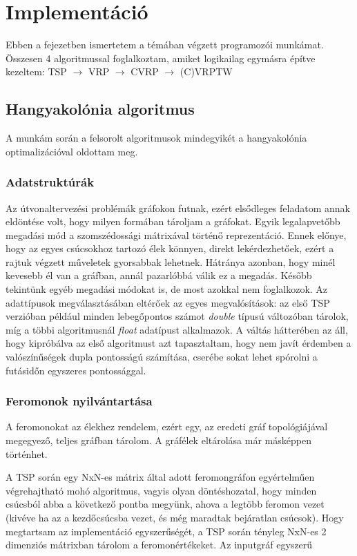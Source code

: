 \chapter{Implementáció}

Ebben a fejezetben ismertetem a témában végzett programozói munkámat. Összesen 4 algoritmussal foglalkoztam, amiket logikailag egymásra építve kezeltem:
TSP  \(\rightarrow\) VRP \(\rightarrow\) CVRP \(\rightarrow\) (C)VRPTW

\section{Hangyakolónia algoritmus}
A munkám során a felsorolt algoritmusok mindegyikét a hangyakolónia optimalizációval oldottam meg.

\subsection{Adatstruktúrák}
Az útvonaltervezési problémák gráfokon futnak, ezért elsődleges feladatom annak eldöntése volt, hogy milyen formában tároljam a gráfokat. Egyik legalapvetőbb megadási mód a szomszédossági mátrixával történő reprezentáció. Ennek előnye, hogy az egyes csúcsokhoz tartozó élek könnyen, direkt lekérdezhetőek, ezért a rajtuk végzett műveletek gyorsabbak lehetnek. Hátránya azonban, hogy minél kevesebb él van a gráfban, annál pazarlóbbá válik ez a megadás. Később tekintünk egyéb megadási módokat is, de most azokkal nem foglalkozok.
Az adattípusok megválasztásában eltérőek az egyes megvalósítások: az első TSP verzióban például minden lebegőpontos számot \textit{double} típusú változóban tárolok, míg a többi algoritmusnál \textit{float} adatípust alkalmazok. A váltás hátterében az áll, hogy kipróbálva az első algoritmust azt tapasztaltam, hogy nem javít érdemben a valószínűségek dupla pontosságú számítása, cserébe sokat lehet spórolni a futásidőn egyszeres pontossággal.


\subsection{Feromonok nyilvántartása}
A feromonokat az élekhez rendelem, ezért egy, az eredeti gráf topológiájával megegyező, teljes gráfban tárolom. A gráfélek eltárolása már másképpen történhet. 

A TSP során egy NxN-es mátrix által adott feromongráfon egyértelműen végrehajtható mohó algoritmus, vagyis olyan döntéshozatal, hogy minden csúcsból abba a következő pontba megyünk, ahova a legtöbb feromon vezet (kivéve ha az a kezdőcsúcsba vezet, és még maradtak bejáratlan csúcsok). Hogy megtartsam az implementáció egyszerűségét, a TSP során tényleg NxN-es 2 dimenziós mátrixban tárolom a feromonértékeket. Az inputgráf egyszerű


